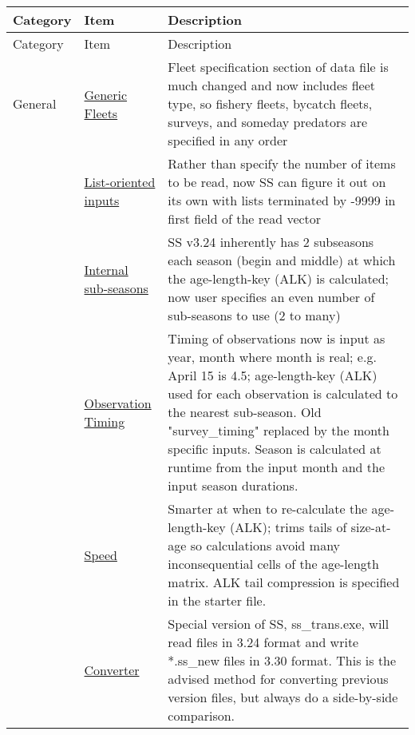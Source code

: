 \begin{center}
	{\renewcommand{\arraystretch}{1.5}%
	\begin{longtable}{p{2cm} p{3cm} p{10cm}}
		\hline
		Category & Item & Description\\
		\hline
		\endfirsthead
		\hline
		\toprule
		Category & Item & Description\\
		\hline
		\endhead

		\hline
		\endfoot

		\endlastfoot
		
		General & 
			\hyperlink{GenericFleets}{Generic Fleets} & 
				Fleet specification section of data file is much changed and now includes fleet type, so fishery fleets, bycatch fleets, surveys, and someday predators are specified in any order\\

		  & \hyperlink{ListBased}{List-oriented inputs} & 
			    Rather than specify the number of items to be read, now SS can figure it out on its own with lists terminated by -9999 in first field of the read vector \\
		  
		  & \hyperlink{SubSeas}{Internal sub-seasons} & 
			    SS v3.24 inherently has 2 subseasons each season (begin and middle) at which the age-length-key (ALK) is calculated; now user specifies an even number of sub-seasons to use (2 to many) \\

		  & \hyperlink{ObsTiming}{Observation Timing} & 
			    Timing of observations now is input as year, month where month is real; e.g. April 15 is 4.5; age-length-key (ALK) used for each observation is calculated to the nearest sub-season.  Old "survey\_timing" replaced by the month specific inputs.  Season is calculated at runtime from the input month and the input season durations. \\

		  & \hyperlink{ALK}{Speed} & 
			    Smarter at when to re-calculate the age-length-key (ALK); trims tails of size-at-age so calculations avoid many inconsequential cells of the age-length matrix. ALK tail compression is specified in the starter file.\\
		
		  & \hyperlink{Convert} {Converter} & 
			    Special version of SS, ss\_trans.exe, will read files in 3.24 format and write *.ss\_new files in 3.30 format.  This is the advised method for converting previous version files, but always do a side-by-side comparison.\\


\end{longtable}}
\end{center}
